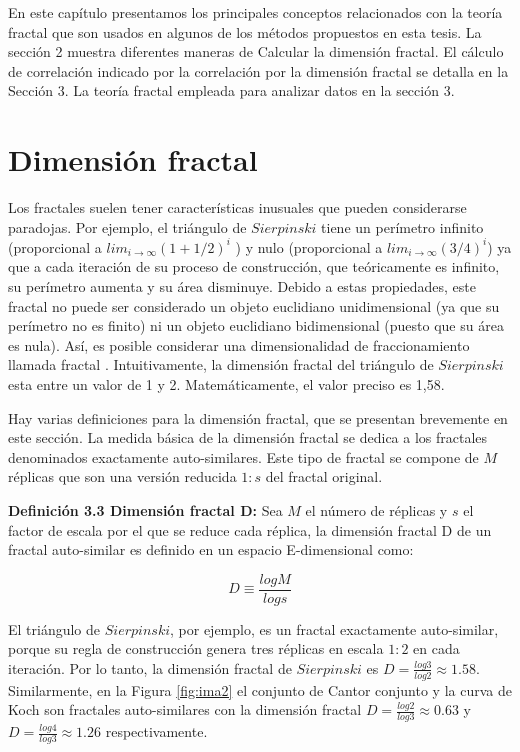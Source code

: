 En este capítulo presentamos los principales conceptos relacionados con la teoría fractal que son usados en algunos de los métodos propuestos en esta tesis. La sección 2 muestra diferentes maneras de Calcular la dimensión fractal. El cálculo de correlación indicado por la correlación por la dimensión fractal se detalla en la Sección 3. La teoría fractal empleada para analizar   datos en la sección 3.

\section{Dimensión fractal}

Los fractales suelen tener características inusuales que pueden considerarse paradojas. Por ejemplo, el triángulo de $Sierpinski$ tiene un perímetro infinito (proporcional a $lim_{i\rightarrow\infty} (1+1/2)^i  $ ) y nulo (proporcional a $lim_{i\rightarrow\infty} (3/4)^i $) ya que a cada iteración de su proceso de construcción, que  teóricamente  es infinito, su perímetro aumenta y su área disminuye. Debido a estas propiedades, este fractal no puede ser considerado un objeto euclidiano unidimensional  (ya que su perímetro no es finito) ni un objeto euclidiano bidimensional (puesto que su área es nula). Así, es posible considerar una dimensionalidad de fraccionamiento llamada fractal \cite{di2016fractal}. Intuitivamente, la dimensión fractal del triángulo de $Sierpinski$ esta entre un valor de 1 y 2. Matemáticamente, el valor preciso es 1,58.

Hay varias definiciones para la dimensión fractal, que se presentan brevemente en este sección. La medida básica de la dimensión fractal se dedica a los fractales denominados exactamente auto-similares. Este tipo de fractal se compone de $M$ réplicas que son   una  versión reducida $1:s$ del fractal original.

\textbf{Definición 3.3 Dimensión fractal D:} Sea $M$ el número de réplicas y $s$ el factor de  escala
 por el que se reduce cada réplica, la dimensión fractal D de un fractal auto-similar es   definido en un espacio E-dimensional como:

\begin{equation}
D \equiv \frac{log M}{log s}
\label{eq:ec1}
\end{equation}

El triángulo de $Sierpinski$, por ejemplo, es un fractal exactamente auto-similar, porque su regla de construcción genera tres réplicas en escala $1:2$ en cada iteración. Por lo tanto, la dimensión fractal de $Sierpinski$ es $D = \frac{log 3}{log 2} \approx 1.58$. Similarmente, en la Figura \ref{fig:ima2}
el conjunto de Cantor conjunto y la curva de Koch son  fractales auto-similares con la dimensión fractal $ D = \frac{log2}{log3} \approx 0.63$ y $ D = \frac{log4}{log3} \approx 1.26$ respectivamente.

